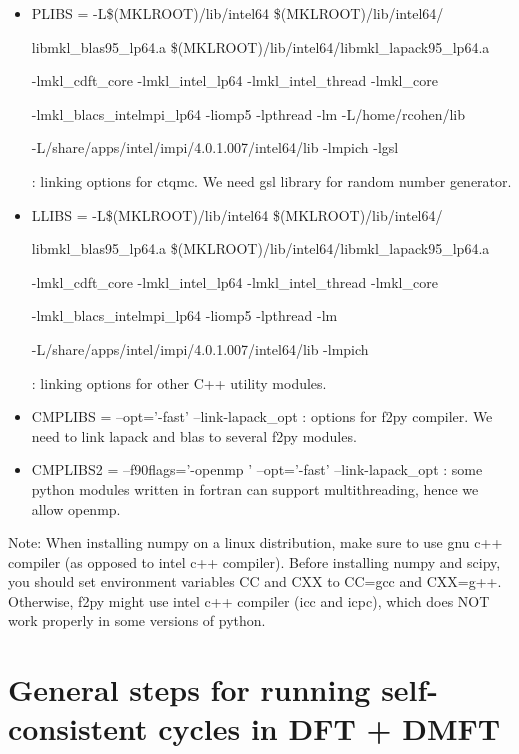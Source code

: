 \documentclass[12 pt]{article}
\begin{document}
{\begin{itemize}
  \item PLIBS = -L\$(MKLROOT)/lib/intel64 \$(MKLROOT)/lib/intel64/

  libmkl\_blas95\_lp64.a \$(MKLROOT)/lib/intel64/libmkl\_lapack95\_lp64.a

  -lmkl\_cdft\_core -lmkl\_intel\_lp64 -lmkl\_intel\_thread -lmkl\_core

  -lmkl\_blacs\_intelmpi\_lp64 -liomp5 -lpthread -lm -L/home/rcohen/lib

  -L/share/apps/intel/impi/4.0.1.007/intel64/lib -lmpich -lgsl 

  : linking options for ctqmc. We need gsl library for random number generator.

  \item LLIBS = -L\$(MKLROOT)/lib/intel64 \$(MKLROOT)/lib/intel64/

  libmkl\_blas95\_lp64.a \$(MKLROOT)/lib/intel64/libmkl\_lapack95\_lp64.a

  -lmkl\_cdft\_core -lmkl\_intel\_lp64 -lmkl\_intel\_thread -lmkl\_core

  -lmkl\_blacs\_intelmpi\_lp64 -liomp5 -lpthread -lm

  -L/share/apps/intel/impi/4.0.1.007/intel64/lib -lmpich

  : linking options for other C++ utility modules.

  \item CMPLIBS = --opt='-fast' --link-lapack\_opt : options for f2py compiler. We need to link lapack and blas to 
several f2py modules.

  \item CMPLIBS2 = --f90flags='-openmp ' --opt='-fast' --link-lapack\_opt : some python modules written in fortran 
can support multithreading, hence we allow openmp.

  \end{itemize}
}

Note: When installing numpy on a linux distribution, make sure to use gnu c++ compiler (as opposed to intel c++ 
compiler). Before installing numpy and scipy, you should set environment variables CC and CXX to CC=gcc and CXX=g++. 
Otherwise, f2py might use intel c++ compiler (icc and icpc), which does NOT work properly in some versions of python. 
\citep {Haule2010}


  \newpage
  \part{\texorpdfstring{General steps for running self-consistent cycles in DFT + DMFT}{General steps for 
running self-consistent cycles in DFT + DMFT}}
\end{document}
